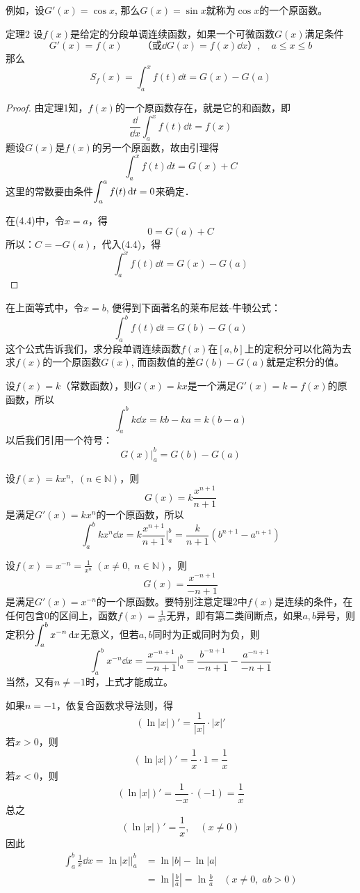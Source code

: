 例如，设$G'(x)=\cos x$, 那么$G(x)=\sin x$就称为$\cos x$的一个原函数。

\begin{blk}
    {定理2} 设$f(x)$是给定的分段单调连续函数，如果一个可微函数$G(x)$满足条件
\begin{equation}
    G'(x)=f(x)\qquad \text{（或$\dd G(x)=f(x)\dd x$）},\quad a\le x\le b
\end{equation}    
那么
\[S_f (x)=\int^x_a  f (t) \dd t=G (x) -G (a) \]
\end{blk}

\begin{proof}
    由定理1知，$f(x)$的一个原函数存在，就是它的和函数，即
\[\frac{\dd }{\dd x}\int^x_a f(t)\dd t=f(x)\]
题设$G(x)$是$f(x)$的另一个原函数，故由引理得
\begin{equation}
    \int^x_a    f (t) dt=G (x) +C 
\end{equation}
这里的常数要由条件$\displaystyle\int^a_a f(t)\,{\rm d} t=0$来确定．

在(4.4)中，令$x=a$，得
\[0=G(a)+C\]
所以：$C=-G(a)$，代入(4.4)，得
\[\int^x_a f(t)\dd t=G(x)-G(a)\]
\end{proof}

在上面等式中，令$x=b$, 便得到下面著名的莱布尼兹-牛顿公式：
\[\int^b_a f (t) \dd t= G (b) -G (a) \]
这个公式告诉我们，求分段单调连续函数$f(x)$在$[a,b]$上的定积分可以化简为去求$f(x)$的一个原函数$G(x)$, 而函数值的差$G(b)-G(a)$就是定积分的值。

\begin{example}
    设$f(x)=k$（常数函数），则$G(x)=kx$是一个满足$G'(x)=k=f(x)$的原函数，所以
\[\int^b_a k\dd x=kb-ka=k(b-a)\]
以后我们引用一个符号：
\[G(x)\Bigg|^b_a=G(b)-G(a)\]
\end{example}

\begin{example}
    设$f(x)=kx^n,\; (n\in\mathbb{N})$，则
\[G(x)=k\frac{x^{n+1}}{n+1}\]
是满足$G'(x)=kx^n$的一个原函数，所以
\[\int^b_akx^n\dd x=k\frac{x^{n+1}}{n+1}\Bigg|^b_a=\frac{k}{n+1}(b^{n+1}-a^{n+1})\]
\end{example}

\begin{example}
设$f(x)=x^{-n}=\frac{1}{x^n}\; (x\ne 0,\; n\in\mathbb{N})$，则
\[G(x)=\frac{x^{-n+1}}{-n+1}\]
是满足$G'(x)=x^{-n}$的一个原函数。要特别注意定理2中$f(x)$是连续的条件，在任何包含0的区间上，函数$f(x)=\frac{1}{x^n}$无界，即有第二类间断点，如果$a,b$异号，则定积分$\displaystyle\int^b_a x^{-n}\,{\rm d} x$无意义，但若$a,b$同时为正或同时为负，则
\[\int^b_ax^{-n}\dd x=\frac{x^{-n+1}}{-n+1}\Bigg|^b_a=\frac{b^{-n+1}}{-n+1}-\frac{a^{-n+1}}{-n+1}\]
当然，又有$n\ne -1$时，上式才能成立。

如果$n=-1$，依复合函数求导法则，得
\[(\ln|x|)'=\frac{1}{|x|}\cdot |x|'\]
若$x>0$，则
\[(\ln|x|)'=\frac{1}{x}\cdot 1=\frac{1}{x}\]
若$x<0$，则
\[(\ln|x|)'=\frac{1}{-x}\cdot (-1)=\frac{1}{x}\]
总之
\[(\ln|x|)'=\frac{1}{x},\quad (x\ne 0)\]
因此
\[\begin{split}
\int^b_a \frac{1}{x}\dd x=\ln |x|\Bigg|^b_a &=\ln|b|-\ln |a|\\
&=\ln\left|\frac{b}{a}\right|=\ln\frac{b}{a}\quad (x\ne 0,\; ab>0)
\end{split}\]
\end{example}

